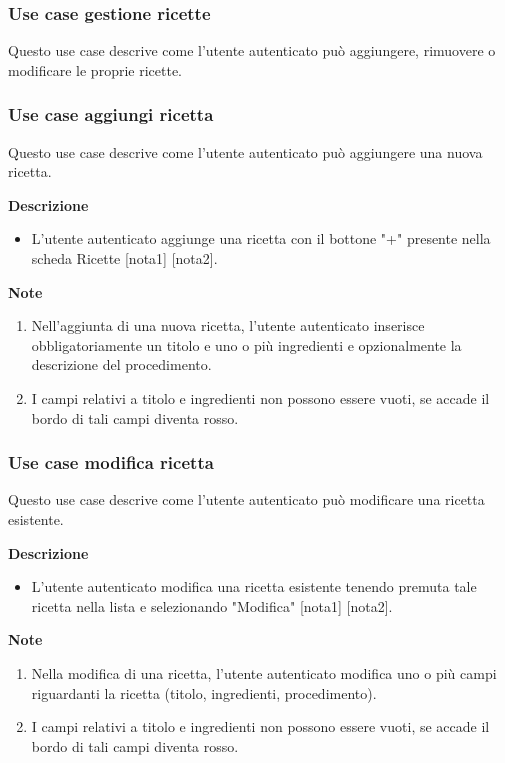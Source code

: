\documentclass[a4paper,12pt]{article}
\begin{document}
\subsubsection*{Use case gestione ricette}

Questo use case descrive come l'utente autenticato può aggiungere, rimuovere o modificare le proprie ricette.




\subsubsection*{Use case aggiungi ricetta}

Questo use case descrive come l'utente autenticato può aggiungere una nuova ricetta.

\textbf{Descrizione}
\begin{itemize} \setlength\itemsep{0.01em}
\item L'utente autenticato aggiunge una ricetta con il bottone "+" presente nella scheda Ricette [nota1] [nota2].
\end{itemize}

\textbf{Note}
\begin{enumerate} \setlength\itemsep{0.01em}
\item Nell'aggiunta di una nuova ricetta, l'utente autenticato inserisce obbligatoriamente un titolo e uno o più ingredienti e opzionalmente la descrizione del procedimento.
\item I campi relativi a titolo e ingredienti non possono essere vuoti, se accade il bordo di tali campi diventa rosso.
\end{enumerate}



\subsubsection*{Use case modifica ricetta}

Questo use case descrive come l'utente autenticato può modificare una ricetta esistente.

\textbf{Descrizione}
\begin{itemize} \setlength\itemsep{0.01em}
\item L'utente autenticato modifica una ricetta esistente tenendo premuta tale ricetta nella lista e selezionando "Modifica" [nota1] [nota2].
\end{itemize}

\textbf{Note}
\begin{enumerate} \setlength\itemsep{0.01em}
\item Nella modifica di una ricetta, l'utente autenticato modifica uno o più campi riguardanti la ricetta (titolo, ingredienti, procedimento).
\item I campi relativi a titolo e ingredienti non possono essere vuoti, se accade il bordo di tali campi diventa rosso.
\end{enumerate}
\end{document}
